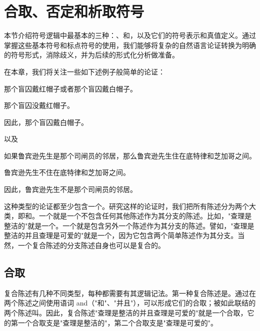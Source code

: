 \section{合取、否定和析取符号}

\begin{logicbox}[title=引言]
本节介绍符号逻辑中最基本的三种：、和，以及它们的符号表示和真值定义。通过掌握这些基本符号和标点符号的使用，我们能够将复杂的自然语言论证转换为明确的符号形式，消除歧义，并为后续的形式化分析做准备。
\end{logicbox}

在本章，我们将关注一些如下述例子般简单的论证：

\begin{examplebox}[title=符号逻辑的应用实例]
那个盲囚戴红帽子或者那个盲囚戴白帽子。

那个盲囚没戴红帽子。

因此，那个盲囚戴白帽子。

以及

如果鲁宾逊先生是那个司闸员的邻居，那么鲁宾逊先生住在底特律和芝加哥之间。

鲁宾逊先生不住在底特律和芝加哥之间。

因此，鲁宾逊先生不是那个司闸员的邻居。
\end{examplebox}

这种类型的论证都至少包含一个。研究这样的论证时，我们把所有陈述分为两个大类，即和。一个就是一个不包含任何其他陈述作为其分支的陈述。比如，"查理是整洁的"就是一个。一个就是包含另外一个陈述作为其分支的陈述。譬如，"查理是整洁的并且查理是可爱的"就是一个，因为它包含两个简单陈述作为其分支。当然，一个复合陈述的分支陈述自身也可以是复合的。\cite{tarski1946}

\subsection{合取}
\begin{theorembox}[title=合取的定义]
复合陈述有几种不同类型，每种都需要有其逻辑记法。第一种复合陈述是。通过在两个陈述之间使用语词 and（"和"、"并且"），可以形成它们的合取；被如此联结的两个陈述叫。因此，复合陈述"查理是整洁的并且查理是可爱的"就是一个合取，它的第一个合取支是"查理是整洁的"，第二个合取支是"查理是可爱的"。
\end{theorembox}

